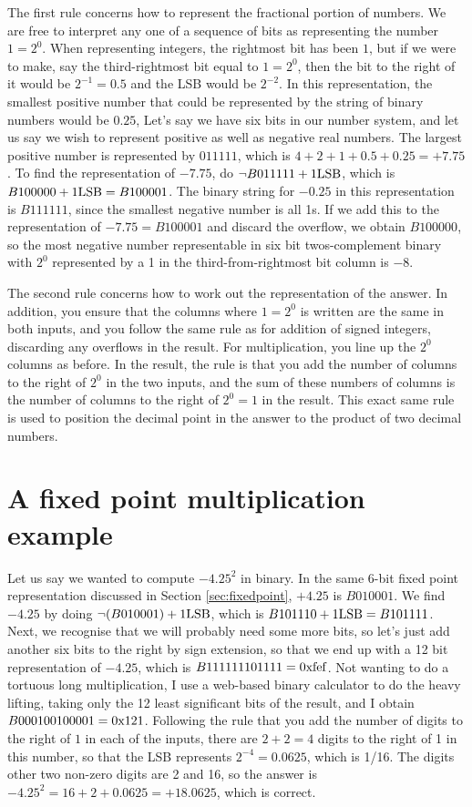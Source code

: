 \documentclass[../physical_computing.tex]{subfiles}
\begin{document}
The first rule concerns how to represent the fractional 
portion of numbers. 
We are free to interpret any one of a sequence of bits
as representing the number $1=2^0$. When representing
integers, the rightmost bit
has been $1$, but if we were to make, say the third-rightmost
bit equal to $1=2^0$, then the bit to the right of it would 
be $2^{-1}=0.5$ and the LSB would be $2^{-2}$. In this 
representation, the smallest positive number that could be 
represented by the string of binary numbers would be $0.25$,
Let's say we have six bits in our number system, and let us 
say we wish to represent positive as well as negative real 
numbers. The largest positive number is represented by 
$011111$, which is $4+2+1+0.5+0.25=+7.75$. To find 
the representation of $-7.75$, do $\neg{B011111}+1{\rm LSB}$, 
which is $B100000+1{\rm LSB}=B100001$. The binary string for
$-0.25$ in this representation is $B111111$, since the smallest
negative number is all 1s. If we add this to the representation
of $-7.75=B100001$ and discard the overflow, we obtain
$B100000$, so the most negative number representable in six
bit twos-complement binary with $2^0$ represented by a 1
in the third-from-rightmost bit column is $-8$.

The second rule concerns how to work out the representation of
the answer. In addition, you ensure that the columns where
$1=2^0$ is written are the same in both inputs, and you follow
the same rule as for addition of signed integers, discarding any 
overflows in the result. For multiplication, you line up the
$2^0$ columns as before. In the result, the rule is that you
add the number of columns to the right of $2^0$ in the two 
inputs, and the sum of these numbers of columns is the number of
columns to the right of $2^0=1$ in the result. This exact same
rule is used to position the decimal point in 
the answer to the product of two decimal numbers.

\section{A fixed point multiplication example}
\label{sec:minusfourandaquarter}

Let us say we wanted to compute $-4.25^2$ in binary. In the
same 6-bit fixed point representation discussed in 
Section \ref{sec:fixedpoint}, $+4.25$ is $B010001$. We
find $-4.25$ by doing $\neg(B010001)+1{\rm LSB}$, which
is $B101110+1{\rm LSB}=B101111$. Next, we recognise that
we will probably need some more bits, so let's just
add another six bits to the right by sign extension,
so that we end up with a 12 bit representation of
$-4.25$, which is $B111111101111={\rm 0xfef}$. Not
wanting to do a tortuous long multiplication, I use
a web-based binary calculator to do the heavy lifting,
taking only the 12 least significant bits of the result, and I 
obtain $B000100100001={\rm 0x121}$.
Following the rule that you add the 
number of digits to the right of $1$ in each of the inputs,
there are $2+2=4$ digits to the right of 1 in this number,
so that the LSB represents $2^{-4}=0.0625$, which is 1/16.
The digits other two non-zero digits are 2 and 16, so the 
answer is $-4.25^2=16+2+0.0625=+18.0625$, which is correct.
\end{document}
